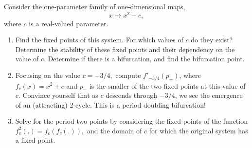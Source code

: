 \documentclass[12pt]{report}
\begin{document}


\begin{problem}
    Consider the one-parameter family of one-dimensional maps,
\begin{equation}
    x \mapsto x^2 + c,
\end{equation}
where $c$ is a real-valued parameter.
    \begin{enumerate}
        \item Find the fixed points of this system. For which values of $c$ do they exist? Determine the stability of these fixed points and their dependency on the value of $c$. Determine if there is a bifurcation, and find the bifurcation point.
        \item Focusing on the value $c = -3/4,$ compute $f'_{-3/4}(p_{-})$, where $f_c(x) = x^2 + c$ and $p_{-}$ is the smaller of the two fixed points at this value of $c.$ Convince yourself that as $c$ descends through $-3/4$, we see the emergence of an (attracting) 2-cycle. This is a period doubling bifurcation!
        \item Solve for the period two points by considering the fixed points of the function $f_c^2(.) = f_c(f_c(.)),$ and the domain of $c$ for which the original system has a fixed point. 
    \end{enumerate}
\end{problem}
\end{document}
